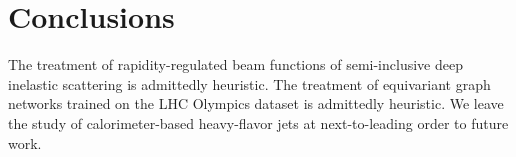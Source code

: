 \section{Conclusions}\label{sec:conclusions}

The treatment of rapidity-regulated beam functions of semi-inclusive
deep inelastic scattering is admittedly heuristic. The treatment of
equivariant graph networks trained on the LHC Olympics dataset is
admittedly heuristic. We leave the study of calorimeter-based
heavy-flavor jets at next-to-leading order to future work.

